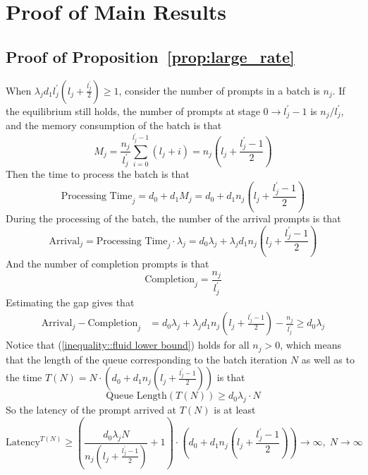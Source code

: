 \section{Proof of Main Results}

\subsection{Proof of Proposition~\ref{prop:large_rate}}\label{appendix::proof of fluid lower bound}
When $\lambda_jd_1l_j^{\prime}\left( l_j + \frac{l_j^\prime}{2} \right)\geq 1$, consider the number of prompts in a batch is $n_j$. If the equilibrium still holds, the number of prompts at stage $0 \to l_j^\prime-1$ is $n_j/l_j^\prime$, and the memory consumption of the batch is that
$$M_j = \frac{n_j}{l_j^\prime}\sum_{i=0}^{l_j^\prime-1}\left( l_j +i \right) = n_j \left(l_j + \frac{l_j^\prime-1}{2} \right)$$
Then the time to process the batch is that
$$\text{Processing Time}_j = d_0+d_1M_j=  
 d_0+d_1n_j \left(l_j + \frac{l_j^\prime-1}{2} \right)
$$
During the processing of the batch, the number of the arrival prompts is that
$$\text{Arrival}_j =\text{Processing Time}_j \cdot \lambda_j= 
 d_0\lambda_j+\lambda_jd_1n_j \left(l_j + \frac{l_j^\prime-1}{2} \right)$$
And the number of completion prompts is that
$$\text{Completion}_j = \frac{n_j}{l_j^\prime}$$
Estimating the gap gives that
\begin{align}
    \text{Arrival}_j-\text{Completion}_j  &= d_0\lambda_j+\lambda_jd_1n_j \left(l_j + \frac{l_j^\prime-1}{2} \right) - \frac{n_j}{l_j^\prime}\geq d_0\lambda_j\label{inequality::fluid lower bound}
\end{align}
Notice that (\ref{inequality::fluid lower bound}) holds for all $n_j>0$, which means that the length of the queue corresponding to the batch iteration $N$ as well as to the time $T(N) = N \cdot \left(d_0+d_1n_j\left(l_j + \frac{l_j^\prime-1}{2}\right)\right)$ is that
$$\text{Queue Length}\left(T(N)\right) \geq d_0\lambda_j\cdot N$$
So the latency of the prompt arrived at $T(N)$ is at least 
$$\text{Latency}^{T(N)} \geq  \left(\frac{d_0\lambda_jN}{n_j\left(l_j + \frac{l_j^\prime-1}{2} \right)}+1\right)\cdot \left( 
 d_0+d_1n_j \left(l_j + \frac{l_j^\prime-1}{2} \right) \right)\to \infty,\;N\to \infty$$



